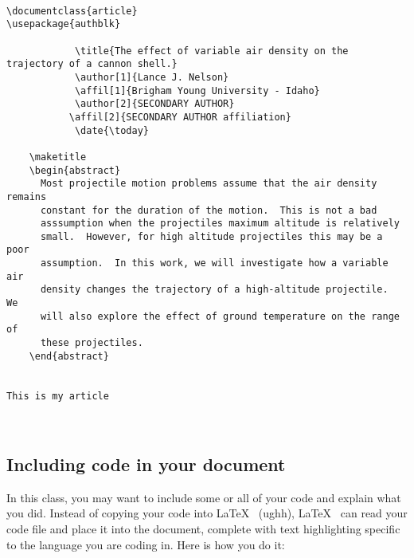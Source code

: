\begin{Verbatim}

\documentclass{article}
\usepackage{authblk}

            \title{The effect of variable air density on the trajectory of a cannon shell.}
            \author[1]{Lance J. Nelson}
            \affil[1]{Brigham Young University - Idaho}
            \author[2]{SECONDARY AUTHOR}
           \affil[2]{SECONDARY AUTHOR affiliation}
            \date{\today}

    \maketitle
    \begin{abstract}
      Most projectile motion problems assume that the air density remains
      constant for the duration of the motion.  This is not a bad
      asssumption when the projectiles maximum altitude is relatively
      small.  However, for high altitude projectiles this may be a poor
      assumption.  In this work, we will investigate how a variable air
      density changes the trajectory of a high-altitude projectile.  We
      will also explore the effect of ground temperature on the range of
      these projectiles.
    \end{abstract}


This is my article



\end{Verbatim}
\pagebreak
\subsection*{Including code in your document}
In this class, you may want to include some or all of your code and
explain what you did.  Instead of copying your code into \LaTeX~
(ughh), \LaTeX~ can read your code file and place it into the
document, complete with text highlighting specific to the language you
are coding in.  Here is how you do it: 

